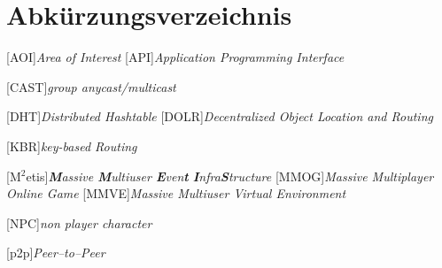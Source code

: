 \chapter*{Abkürzungsverzeichnis}

\pagestyle{useheadings}

\vspace{\topskip}


\begin{acronym}[xxxxxxxxxxxx]
	\setlength{\itemsep}{-\parsep}
	\setlength{\itemindent}{1.5em}
	[AOI]{\emph{Area of Interest}}
	[API]{\emph{Application Programming Interface}}

 [CAST]{\emph{group anycast/multicast}}

	 [DHT]{\emph{Distributed Hashtable}}
	[DOLR]{\emph{Decentralized Object Location and Routing}}



	
	
[KBR]{\emph{key-based Routing}}




	[M$^2$etis]{\emph{\textbf{M}assive \textbf{M}ultiuser \textbf{E}ven\textbf{t} \textbf{I}nfra\textbf{S}tructure}}	
	[MMOG]{\emph{Massive Multiplayer Online Game}}
	[MMVE]{\emph{Massive Multiuser Virtual Environment}}

	[NPC]{\emph{non player character}}


	
	[p2p]{\emph{Peer--to--Peer}}


\end{acronym}
